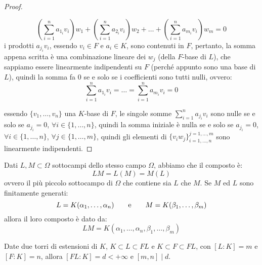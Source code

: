 \documentclass[11pt]{scrartcl}
\begin{document}
\begin{proof}
\begin{itemize}
	\[ \left(\sum_{i=1}^{n} a_{1_i}v_i\right)w_1 +  \left(\sum_{i=1}^{n} a_{2_i}v_i\right)w_2 + \ldots +  \left(\sum_{i=1}^{n} a_{m_i}v_i\right)w_m = 0
	\]
    i prodotti $a_{j_i}v_i$, essendo $v_i \in F$ e $a_i \in K$, sono contenuti in $F$, pertanto, la somma appena scritta è una combinazione lineare dei $w_j$ (della $F$-base di $L$), che sappiamo essere linearmente indipendenti su $F$ (perché appunto sono una base di $L$), quindi la somma fa $0$ se e solo se i coefficienti sono tutti nulli, ovvero:
	\[ \sum_{i=1}^{n} a_{1_i}v_i =\ldots=\sum_{i=1}^{n} a_{m_i}v_i = 0
	\]
	\end{itemize}
    essendo $\{v_1,\ldots,v_n\}$ una $K$-base di $F$, le singole somme $\sum_{i=1}^{n} a_{j_i}v_i$ sono nulle se e solo se $a_{j_i} = 0$, $\forall i \in\{1,\ldots,n\}$, quindi la somma iniziale è nulla se e solo se $a_{j_i} = 0$, $\forall i \in\{1,\ldots,n\}$, $\forall j \in \{1,\ldots,m\}$, quindi gli elementi di $\{v_iw_j\}_{i=1,\ldots,n}^{j=1,\ldots,m}$ sono linearmente indipendenti.
\end{proof}

\pagebreak

\begin{remark}
    Dati $L,M \subset \Omega$ sottocampi dello stesso campo $\Omega$, abbiamo che il composto è:
    \[ LM = L(M) = M(L)
        \]
    ovvero il più piccolo sottocampo di $\Omega$ che contiene sia $L$ che $M$. Se $M$ ed $L$ sono finitamente generati:
    \[ L = K(\alpha_1,\ldots,\alpha_n) \qquad \text e \qquad M = K(\beta_1,\ldots,\beta_m)
        \]
    allora il loro composto è dato da:
    \[ LM = K(\alpha_1,\ldots,\alpha_n,\beta_1,\ldots,\beta_m)
        \]
\end{remark}

\begin{proposition}
    \label{3.10}
    Date due torri di estensioni di $K$, $K \subset L \subset FL$ e $K \subset F \subset FL$, con $[L:K] = m$ e $[F:K] = n$, allora $[FL:K] = d < +\infty$ e $[m,n] \mid d$.
\end{proposition}
\end{document}
